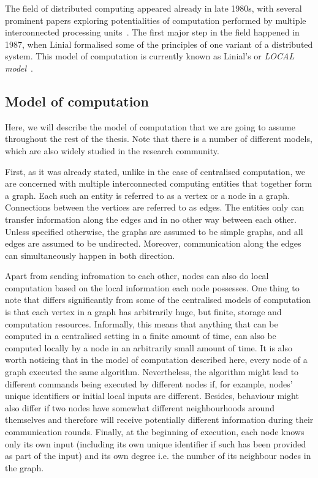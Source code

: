 The field of distributed computing appeared already in late 1980s, with several
prominent papers exploring potentialities of computation performed
by multiple interconnected processing units~\cite{Cole1986, Linial1987, Naor1991}.
The first major step in the field happened in 1987, when Linial formalised
some of the principles of one variant of a distributed system.
This model of computation is currently known as Linial's or \emph{LOCAL model}~\cite{Linial1987}.

\subsection{Model of computation}

Here, we will describe the model of computation that we are going to
assume throughout the rest of the thesis. Note that there is a number
of different models, which are also widely studied in the research
community.

First, as it was already stated, unlike in the case of centralised
computation, we are concerned with multiple interconnected computing entities
that together form a graph. Each such an entity is referred to as a vertex or
a node in a graph. Connections between the vertices are referred to as edges.
The entities only can transfer information along the edges and in no other way
between each other. Unless specified otherwise, the graphs are assumed to be
simple graphs, and all edges are assumed to be undirected. Moreover,
communication along the edges can simultaneously happen in both direction.

Apart from sending infromation to each other, nodes can also
do local computation based on the local information each node possesses. One thing
to note that differs significantly from some of the centralised models of computation
is that each vertex in a graph has arbitrarily huge, but finite, storage and computation resources.
Informally, this means that anything that can be computed in a centralised setting
in a finite amount of time,
can also be computed locally by a node in an arbitrarily small amount of time.
It is also worth noticing that in the model of computation described here,
every node of a graph executed the same algorithm. Nevertheless, the
algorithm might lead to different commands being executed by different nodes
if, for example, nodes' unique identifiers or initial local inputs are different.
Besides, behaviour might also differ if two nodes have somewhat different neighbourhoods
around themselves and therefore will receive potentially different
information during their communication rounds. Finally, at the beginning of
execution, each node knows only its own input (including its own unique identifier
if such has been provided as part of the input) and its own degree i.e. the number of
its neighbour nodes in the graph.

